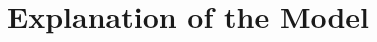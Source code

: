 \documentclass[10pt]{article}
\begin{document}
	\nopagebreak
\section*{Explanation of the Model}
\end{document}
